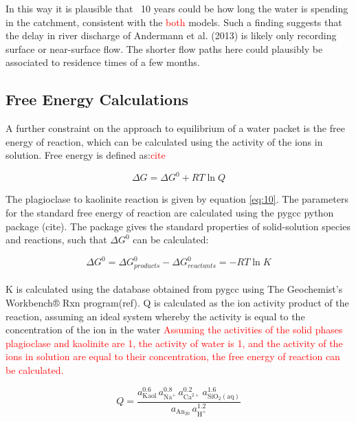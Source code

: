 In this way it is plausible that ~10 years could be how long the water is spending in the catchment, consistent with the \textcolor{red}{both} models. Such a finding suggests that the delay in river discharge of Andermann et al. (2013) is likely only recording surface or near-surface flow. The shorter flow paths here could plausibly be associated to residence times of a few months. 





\subsection{Free Energy Calculations}

A further constraint on the approach to equilibrium of a water packet is the free energy of reaction, which can be calculated using the activity of the ions in solution. Free energy is defined as:\textcolor{red}{cite}

\begin{equation}
    \Delta G = \Delta G^0 + RT \ln Q
\end{equation}

The plagioclase to kaolinite reaction is given by equation \ref{eq:10}. The parameters for the standard free energy of reaction are calculated using the pygcc python package (cite). The package gives the standard properties of solid-solution species and reactions, such that $\Delta G^0$ can be calculated:

\begin{equation}
    \Delta G^0 = \Delta G^0_{products} - \Delta G^0_{reactants} = -RT \ln K
\end{equation}\\
K is calculated using the database obtained from pygcc using The Geochemist's Workbench® Rxn program(ref). Q is calculated as the ion activity product of the reaction, assuming an ideal system whereby the activity is equal to the concentration of the ion in the water \textcolor{red}{Assuming the activities of the solid phases plagioclase and kaolinite are 1, the activity of water is 1, and the activity of the ions in solution are equal to their concentration, the free energy of reaction can be calculated. }

\begin{equation}
    Q = \frac{a_{\mathrm{Kaol}}^{0.6}\,a_{\mathrm{Na}^{+}}^{0.8}\,a_{\mathrm{Ca}^{2+}}^{0.2}\,a_{\mathrm{SiO_{2}(aq)}}^{1.6}}
           {a_{\mathrm{An_{20}}}\,a_{\mathrm{H}^{+}}^{1.2}}
\end{equation}\\

